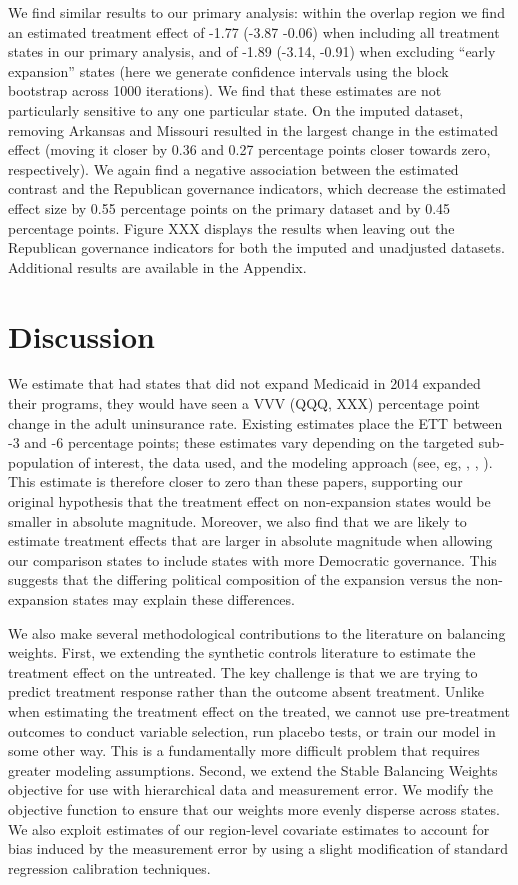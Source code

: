 \documentclass[12pt]{article}
\begin{document}
We find similar results to our primary analysis: within the overlap region we find an estimated treatment effect of -1.77 (-3.87 -0.06) when including all treatment states in our primary analysis, and of -1.89 (-3.14, -0.91) when excluding ``early expansion'' states (here we generate confidence intervals using the block bootstrap across 1000 iterations). We find that these estimates are not particularly sensitive to any one particular state. On the imputed dataset, removing Arkansas and Missouri resulted in the largest change in the estimated effect (moving it closer by 0.36 and 0.27 percentage points closer towards zero, respectively). We again find a negative association between the estimated contrast and the Republican governance indicators, which decrease the estimated effect size by 0.55 percentage points on the primary dataset and by 0.45 percentage points. Figure XXX displays the results when leaving out the Republican governance indicators for both the imputed and unadjusted datasets. Additional results are available in the Appendix.

\section{Discussion}

We estimate that had states that did not expand Medicaid in 2014 expanded their programs, they would have seen a VVV (QQQ, XXX) percentage point change in the adult uninsurance rate. Existing estimates place the ETT between -3 and -6 percentage points; these estimates vary depending on the targeted sub-population of interest, the data used, and the modeling approach (see, eg, \cite{courtemanche2017early}, \cite{kaestner2017effects}, \cite{frean2017premium}). This estimate is therefore closer to zero than these  papers, supporting our original hypothesis that the treatment effect on non-expansion states would be smaller in absolute magnitude. Moreover, we also find that we are likely to estimate treatment effects that are larger in absolute magnitude when allowing our comparison states to include states with more Democratic governance. This suggests that the differing political composition of the expansion versus the non-expansion states may explain these differences.

We also make several methodological contributions to the literature on balancing weights. First, we extending the synthetic controls literature to estimate the treatment effect on the untreated. The key challenge is that we are trying to predict treatment response rather than the outcome absent treatment. Unlike when estimating the treatment effect on the treated, we cannot use pre-treatment outcomes to conduct variable selection, run placebo tests, or train our model in some other way. This is a fundamentally more difficult problem that requires greater modeling assumptions. Second, we extend the Stable Balancing Weights objective for use with hierarchical data and measurement error. We modify the objective function to ensure that our weights more evenly disperse across states. We also exploit estimates of our region-level covariate estimates to account for bias induced by the measurement error by using a slight modification of standard regression calibration techniques.
\end{document}
